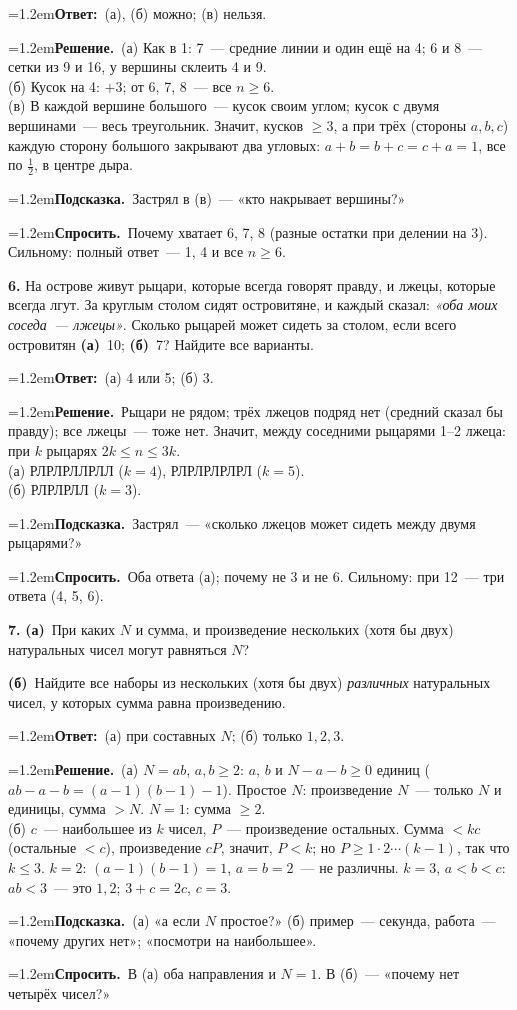 \documentclass[10pt,a4paper]{article}
\newcommand{\usl}[1]{\par\vspace{7pt}\noindent\colorbox{black!7}{\parbox{\dimexpr\linewidth-2\fboxsep}{#1}}\par\vspace{2pt}}
\newcommand{\pole}[2]{\par\noindent\hangindent=1.2em\textbf{#1}\ #2\par}
\begin{document}
\pole{Ответ:}{(а), (б) можно; (в) нельзя.}
\pole{Решение.}{(а) Как в 1: 7~--- средние линии и один ещё на 4; 6 и 8~--- сетки из 9 и 16, у вершины склеить 4 и 9.\\ (б) Кусок на 4: $+3$; от 6, 7, 8~--- все $n\ge6$.\\ (в) В каждой вершине большого~--- кусок своим углом; кусок с двумя вершинами~--- весь треугольник. Значит, кусков $\ge3$, а при трёх (стороны $a,b,c$) каждую сторону большого закрывают два угловых: $a+b=b+c=c+a=1$, все по $\tfrac12$, в центре дыра.}
\pole{Подсказка.}{Застрял в (в)~--- «кто накрывает вершины?»}
\pole{Спросить.}{Почему хватает 6, 7, 8 (разные остатки при делении на 3). Сильному: полный ответ~--- 1, 4 и все $n\ge6$.}
\usl{\textbf{6.} На острове живут рыцари, которые всегда говорят правду, и лжецы,
которые всегда лгут. За круглым столом сидят островитяне, и каждый сказал:
\textit{«оба моих соседа~--- лжецы»}. Сколько рыцарей может сидеть за столом,
если всего островитян \textbf{(а)}~10; \textbf{(б)}~7? Найдите все варианты.}
\pole{Ответ:}{(а) 4 или 5; (б) 3.}
\pole{Решение.}{Рыцари не рядом; трёх лжецов подряд нет (средний сказал бы правду); все лжецы~--- тоже нет. Значит, между соседними рыцарями 1--2 лжеца: при $k$ рыцарях $2k\le n\le3k$.\\ (а) РЛРЛРЛЛРЛЛ ($k=4$), РЛРЛРЛРЛРЛ ($k=5$).\\ (б) РЛРЛРЛЛ ($k=3$).}
\pole{Подсказка.}{Застрял~--- «сколько лжецов может сидеть между двумя рыцарями?»}
\pole{Спросить.}{Оба ответа (а); почему не 3 и не 6. Сильному: при 12~--- три ответа (4, 5, 6).}
\usl{\textbf{7.} \textbf{(а)}~При каких $N$ и сумма, и произведение нескольких (хотя бы двух)
натуральных чисел могут равняться $N$?\par
\textbf{(б)}~Найдите все наборы из нескольких (хотя бы двух) \textit{различных} натуральных чисел,
у которых сумма равна произведению.}
\pole{Ответ:}{(а) при составных $N$; (б) только $1,2,3$.}
\pole{Решение.}{(а) $N=ab$, $a,b\ge2$: $a$, $b$ и $N-a-b\ge0$ единиц ($ab-a-b=(a-1)(b-1)-1$). Простое $N$: произведение $N$~--- только $N$ и единицы, сумма $>N$. $N=1$: сумма $\ge2$.\\ (б) $c$~--- наибольшее из $k$ чисел, $P$~--- произведение остальных. Сумма $<kc$ (остальные $<c$), произведение $cP$, значит, $P<k$; но $P\ge1\cdot2\cdots(k-1)$, так что $k\le3$. $k=2$: $(a-1)(b-1)=1$, $a=b=2$~--- не различны. $k=3$, $a<b<c$: $ab<3$~--- это $1,2$; $3+c=2c$, $c=3$.}
\pole{Подсказка.}{(а) «а если $N$ простое?» (б) пример~--- секунда, работа~--- «почему других нет»; «посмотри на наибольшее».}
\pole{Спросить.}{В (а) оба направления и $N=1$. В (б)~--- «почему нет четырёх чисел?»}
\end{document}
